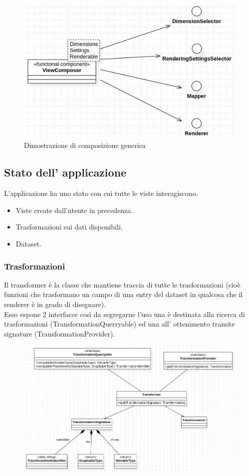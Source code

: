 \begin{figure}[h!]
  \centering
  \includegraphics[scale=0.55]{../../assets/classi_uml/comdelcomposer.png}
  \caption{Dimostrazione di composizione generica}
\end{figure}
\newpage

\subsection{Stato dell' applicazione}
L'applicazione ha uno stato con cui tutte le viste interagiscono.
\begin{itemize}
  \item Viste create dall'utente in precedenza.
  \item Trasformazioni sui dati disponibili.
  \item Dataset.
\end{itemize}

\subsubsection{Trasformazioni}
Il transformer è la classe che mantiene traccia di tutte le trasformazioni (cioè
funzioni che trasformano un campo di una entry del dataset in qualcosa che il
renderer è in grado di disegnare). \\
Esso espone 2 interfacce così da segregarne l'uso una è destinata alla ricerca di
trasformazioni (TransformationQuerryable) ed una all' ottenimento tramite
signature (TransformationProvider).
\begin{figure}[h!]
  \centering
  \includegraphics[scale=0.65]{../../assets/classi_uml/modeltransfomer.png}
\end{figure}

